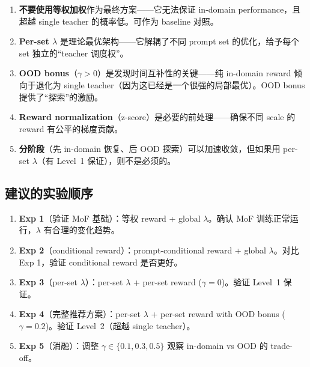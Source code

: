 \documentclass[11pt,a4paper]{article}
\theoremstyle{definition}
\begin{document}
\bigskip

\begin{tcolorbox}[colback=yellow!5, colframe=yellow!60!black, title=核心结论]
\begin{enumerate}[leftmargin=1.5em]
\item \textbf{不要使用等权加权}作为最终方案——它无法保证 in-domain performance，且超越 single teacher 的概率低。可作为 baseline 对照。

\item \textbf{Per-set $\lambda$} 是理论最优架构——它解耦了不同 prompt set 的优化，给予每个 set 独立的``teacher 调度权''。

\item \textbf{OOD bonus}（$\gamma > 0$）是发现时间互补性的关键——纯 in-domain reward 倾向于退化为 single teacher（因为这已经是一个很强的局部最优）。OOD bonus 提供了``探索''的激励。

\item \textbf{Reward normalization}（z-score）是必要的前处理——确保不同 scale 的 reward 有公平的梯度贡献。

\item \textbf{分阶段}（先 in-domain 恢复、后 OOD 探索）可以加速收敛，但如果用 per-set $\lambda$（有 Level~1 保证），则不是必须的。
\end{enumerate}
\end{tcolorbox}

\subsection{建议的实验顺序}

\begin{enumerate}[leftmargin=1.5em]
\item \textbf{Exp 1}（验证 MoF 基础）：等权 reward + global $\lambda$。确认 MoF 训练正常运行，$\lambda$ 有合理的变化趋势。
\item \textbf{Exp 2}（conditional reward）：prompt-conditional reward + global $\lambda$。对比 Exp 1，验证 conditional reward 是否更好。
\item \textbf{Exp 3}（per-set $\lambda$）：per-set $\lambda$ + per-set reward ($\gamma = 0$)。验证 Level~1 保证。
\item \textbf{Exp 4}（完整推荐方案）：per-set $\lambda$ + per-set reward with OOD bonus ($\gamma = 0.2$)。验证 Level~2（超越 single teacher）。
\item \textbf{Exp 5}（消融）：调整 $\gamma \in \{0.1, 0.3, 0.5\}$ 观察 in-domain vs OOD 的 trade-off。
\end{enumerate}
\end{document}
